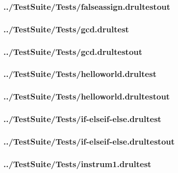 \begin{changemargin}{-1in}{-1in}
\subsubsection{../TestSuite/Tests/falseassign.drultestout}


\subsubsection{../TestSuite/Tests/gcd.drultest}


\subsubsection{../TestSuite/Tests/gcd.drultestout}


\subsubsection{../TestSuite/Tests/helloworld.drultest}


\subsubsection{../TestSuite/Tests/helloworld.drultestout}


\subsubsection{../TestSuite/Tests/if-elseif-else.drultest}


\subsubsection{../TestSuite/Tests/if-elseif-else.drultestout}


\subsubsection{../TestSuite/Tests/instrum1.drultest}



\end{changemargin}

